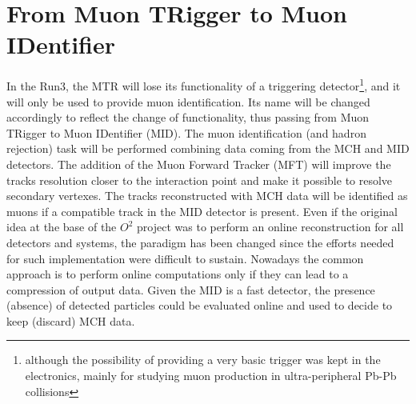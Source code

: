 \section{From Muon TRigger to Muon IDentifier}
In the Run3, the MTR will lose its functionality of a triggering detector\footnote{although the possibility of providing a very basic trigger was kept in the electronics, mainly for studying muon production in ultra-peripheral Pb-Pb collisions}, and it will only be used to provide muon identification. 
Its name will be changed accordingly to reflect the change of functionality, thus passing from Muon TRigger to Muon IDentifier (MID).
The muon identification (and hadron rejection) task will be performed combining data coming from the MCH and MID detectors.
The addition of the Muon Forward Tracker (MFT) \cite{CERN-LHCC-2015-001} will improve the tracks resolution closer to the interaction point and make it possible to resolve secondary vertexes.
The tracks reconstructed with MCH data will be identified as muons if a compatible track in the MID detector is present.
Even if the original idea at the base of the $O^2$ project was to perform an online reconstruction for all detectors and systems, the paradigm has been changed since the efforts needed for such implementation were difficult to sustain.
Nowadays the common approach is to perform online computations only if they can lead to a compression of output data.
Given the MID is a fast detector, the presence (absence) of detected particles could be evaluated online and used to decide to keep (discard) MCH data.
